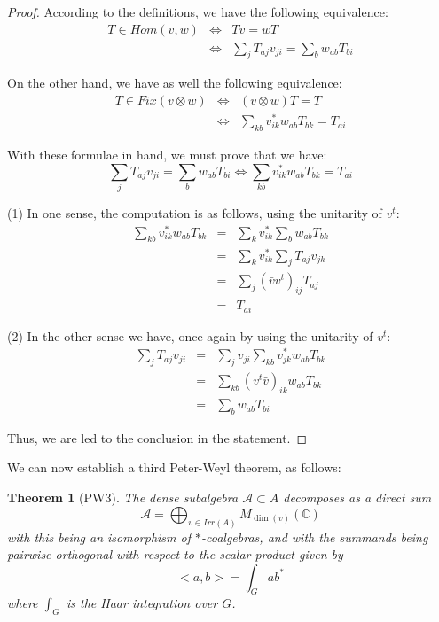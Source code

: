 \documentclass[12pt]{amsbook}
\newtheorem{theorem}{Theorem}[chapter]
\begin{document}
\begin{proof}
According to the definitions, we have the following equivalence:
\begin{eqnarray*}
T\in Hom(v,w)
&\iff&Tv=wT\\
&\iff&\sum_jT_{aj}v_{ji}=\sum_bw_{ab}T_{bi}
\end{eqnarray*}

On the other hand, we have as well the following equivalence:
\begin{eqnarray*}
T\in Fix(\bar{v}\otimes w)
&\iff&(\bar{v}\otimes w)T=T\\
&\iff&\sum_{kb}v_{ik}^*w_{ab}T_{bk}=T_{ai}
\end{eqnarray*}

With these formulae in hand, we must prove that we have:
$$\sum_jT_{aj}v_{ji}=\sum_bw_{ab}T_{bi}\iff \sum_{kb}v_{ik}^*w_{ab}T_{bk}=T_{ai}$$

(1) In one sense, the computation is as follows, using the unitarity of $v^t$:
\begin{eqnarray*}
\sum_{kb}v_{ik}^*w_{ab}T_{bk}
&=&\sum_kv_{ik}^*\sum_bw_{ab}T_{bk}\\
&=&\sum_kv_{ik}^*\sum_jT_{aj}v_{jk}\\
&=&\sum_j(\bar{v}v^t)_{ij}T_{aj}\\
&=&T_{ai}
\end{eqnarray*}

(2) In the other sense we have, once again by using the unitarity of $v^t$:
\begin{eqnarray*}
\sum_jT_{aj}v_{ji}
&=&\sum_jv_{ji}\sum_{kb}v_{jk}^*w_{ab}T_{bk}\\
&=&\sum_{kb}(v^t\bar{v})_{ik}w_{ab}T_{bk}\\
&=&\sum_bw_{ab}T_{bi}
\end{eqnarray*}

Thus, we are led to the conclusion in the statement.
\end{proof}

We can now establish a third Peter-Weyl theorem, as follows:


\begin{theorem}[PW3]
The dense subalgebra $\mathcal A\subset A$ decomposes as a direct sum 
$$\mathcal A=\bigoplus_{v\in Irr(A)}M_{\dim(v)}(\mathbb C)$$
with this being an isomorphism of $*$-coalgebras, and with the summands being pairwise orthogonal with respect to the scalar product given by
$$<a,b>=\int_Gab^*$$
where $\int_G$ is the Haar integration over $G$.
\end{theorem}
\end{document}
